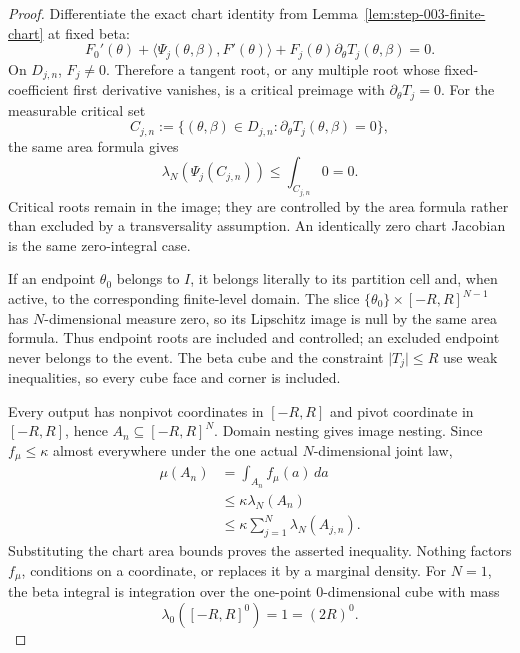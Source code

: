 \begin{proof}
Differentiate the exact chart identity from Lemma~\ref{lem:step-003-finite-chart} at fixed beta:
\begin{equation}
\label{eq:appendix-display-087}
F_0'(\theta)
+\langle\Psi_j(\theta,\beta),F'(\theta)\rangle
+F_j(\theta)\partial_\theta T_j(\theta,\beta)
=0.
\end{equation}
On \(D_{j,n}\), \(F_j\neq0\). Therefore a tangent root, or any multiple root whose fixed-coefficient first
derivative vanishes, is a critical preimage with \(\partial_\theta T_j=0\). For the measurable critical set
\begin{equation}
\label{eq:appendix-display-088}
C_{j,n}
:=\{(\theta,\beta)\in D_{j,n}:\partial_\theta T_j(\theta,\beta)=0\},
\end{equation}
the same area formula gives
\begin{equation}
\label{eq:appendix-display-089}
\lambda_N(\Psi_j(C_{j,n}))
\leq\int_{C_{j,n}}0=0.
\end{equation}
Critical roots remain in the image; they are controlled by the area formula rather than excluded by a
transversality assumption. An identically zero chart Jacobian is the same zero-integral case.

If an endpoint \(\theta_0\) belongs to \(I\), it belongs literally to its partition cell and, when active, to
the corresponding finite-level domain. The slice
\(\{\theta_0\}\times[-R,R]^{N-1}\) has \(N\)-dimensional measure zero, so its Lipschitz image is null by the
same area formula. Thus endpoint roots are included and controlled; an excluded endpoint never belongs to the
event. The beta cube and the constraint \(\lvert T_j\rvert\leq R\) use weak inequalities, so every cube face
and corner is included.

Every output has nonpivot coordinates in \([-R,R]\) and pivot coordinate in \([-R,R]\), hence
\(A_n\subseteq[-R,R]^N\). Domain nesting gives image nesting. Since \(f_\mu\leq\kappa\) almost everywhere
under the one actual \(N\)-dimensional joint law,
\begin{equation}
\label{eq:appendix-display-090}
\begin{aligned}
\mu(A_n)
&=\int_{A_n}f_\mu(a)\,da\\
&\leq\kappa\lambda_N(A_n)\\
&\leq\kappa\sum_{j=1}^N\lambda_N(A_{j,n}).
\end{aligned}
\end{equation}
Substituting the chart area bounds proves the asserted inequality. Nothing factors \(f_\mu\), conditions on
a coordinate, or replaces it by a marginal density. For \(N=1\), the beta integral is integration over the
one-point \(0\)-dimensional cube with mass
\begin{equation}
\label{eq:appendix-display-091}
\lambda_0([-R,R]^0)=1=(2R)^0.
\end{equation}

\end{proof}

